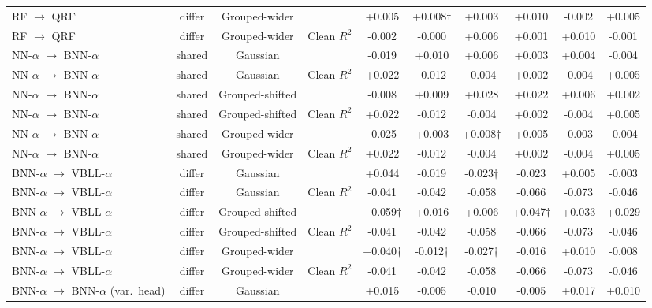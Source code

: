 \begin{table}[!htbp]
\begin{adjustbox}{max width=\textwidth,max totalheight=0.78\textheight}
\begin{tabular}{lccccccccc}
RF $\rightarrow$ QRF & differ & Grouped-wider & \aucnorm{} & +0.005 & +0.008$\dagger$ & +0.003 & +0.010 & -0.002 & +0.005 \\
RF $\rightarrow$ QRF & differ & Grouped-wider & Clean $R^2$ & -0.002 & -0.000 & +0.006 & +0.001 & +0.010 & -0.001 \\
NN-$\alpha$ $\rightarrow$ BNN-$\alpha$ & shared & Gaussian & \aucnorm{} & -0.019 & +0.010 & +0.006 & +0.003 & +0.004 & -0.004 \\
NN-$\alpha$ $\rightarrow$ BNN-$\alpha$ & shared & Gaussian & Clean $R^2$ & +0.022 & -0.012 & -0.004 & +0.002 & -0.004 & +0.005 \\
NN-$\alpha$ $\rightarrow$ BNN-$\alpha$ & shared & Grouped-shifted & \aucnorm{} & -0.008 & +0.009 & +0.028 & +0.022 & +0.006 & +0.002 \\
NN-$\alpha$ $\rightarrow$ BNN-$\alpha$ & shared & Grouped-shifted & Clean $R^2$ & +0.022 & -0.012 & -0.004 & +0.002 & -0.004 & +0.005 \\
NN-$\alpha$ $\rightarrow$ BNN-$\alpha$ & shared & Grouped-wider & \aucnorm{} & -0.025 & +0.003 & +0.008$\dagger$ & +0.005 & -0.003 & -0.004 \\
NN-$\alpha$ $\rightarrow$ BNN-$\alpha$ & shared & Grouped-wider & Clean $R^2$ & +0.022 & -0.012 & -0.004 & +0.002 & -0.004 & +0.005 \\
BNN-$\alpha$ $\rightarrow$ VBLL-$\alpha$ & differ & Gaussian & \aucnorm{} & +0.044 & -0.019 & -0.023$\dagger$ & -0.023 & +0.005 & -0.003 \\
BNN-$\alpha$ $\rightarrow$ VBLL-$\alpha$ & differ & Gaussian & Clean $R^2$ & -0.041 & -0.042 & -0.058 & -0.066 & -0.073 & -0.046 \\
BNN-$\alpha$ $\rightarrow$ VBLL-$\alpha$ & differ & Grouped-shifted & \aucnorm{} & +0.059$\dagger$ & +0.016 & +0.006 & +0.047$\dagger$ & +0.033 & +0.029 \\
BNN-$\alpha$ $\rightarrow$ VBLL-$\alpha$ & differ & Grouped-shifted & Clean $R^2$ & -0.041 & -0.042 & -0.058 & -0.066 & -0.073 & -0.046 \\
BNN-$\alpha$ $\rightarrow$ VBLL-$\alpha$ & differ & Grouped-wider & \aucnorm{} & +0.040$\dagger$ & -0.012$\dagger$ & -0.027$\dagger$ & -0.016 & +0.010 & -0.008 \\
BNN-$\alpha$ $\rightarrow$ VBLL-$\alpha$ & differ & Grouped-wider & Clean $R^2$ & -0.041 & -0.042 & -0.058 & -0.066 & -0.073 & -0.046 \\
BNN-$\alpha$ $\rightarrow$ BNN-$\alpha$ (var.\ head) & differ & Gaussian & \aucnorm{} & +0.015 & -0.005 & -0.010 & -0.005 & +0.017 & +0.010 \\

\end{tabular}
\end{adjustbox}
\end{table}
